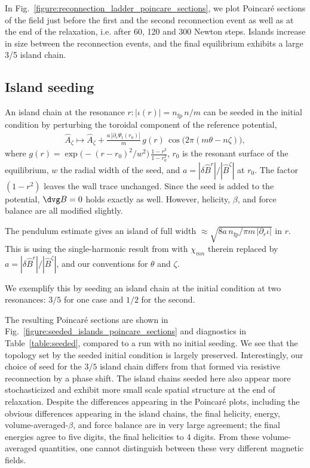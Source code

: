 \documentclass[%
 reprint,
 superscriptaddress,
 amsmath,amssymb,
 aps, nofootinbib, floatfix]{revtex4-2}
\begin{document}
In Fig.~\ref{figure:reconnection_ladder_poincare_sections}, we plot Poincar\'e sections of the field just before the first and the second reconnection event as well as at the end of the relaxation, i.e. after 60, 120 and 300 Newton steps. Islands increase in size between the reconnection events, and the final equilibrium exhibits a large 3/5 island chain.

\subsection{Island seeding}
\label{sec:island_seeding}

An island chain at the resonance $r: |\iota(r)| = n_{\mathrm{fp}}\, n / m$ can be seeded in the initial condition by perturbing the toroidal component of the reference potential,
\begin{align}
    \label{eq:island_seed}
    \hat A_\zeta \mapsto \hat A_\zeta + \frac{a \, |\partial_r \Psi_{\mathrm t}(r_0)|}{m}\, g(r)\, \cos\big( 2\pi (m\theta - n\zeta) \big),
\end{align}
where $g(r) = \exp\!\big(-(r - r_0)^2 / w^2\big)\, \frac{1 - r^2}{1 - r_0^2}$, $r_0$ is the resonant surface of the equilibrium, $w$ the radial width of the seed, and $a = |\delta \hat B^r| / |\hat B^\zeta|$ at $r_0$. The factor $(1 - r^2)$ leaves the wall trace unchanged. Since the seed is added to the potential, $\dvg B = 0$ holds exactly as well. However, helicity, $\beta$, and force balance are all modified slightly.   

The pendulum estimate gives an island of full width $\approx \sqrt{{8 a\, n_{\mathrm{fp}}}/{\pi m\,|\partial_r \iota|}}$ in $r$. This is using the single-harmonic result from \citep[Section~2.11]{helander_theory_2014} with $\chi_{mn}$ therein replaced by $a = |\delta \hat B^r| / |\hat B^\zeta|$, and our conventions for $\theta$ and $\zeta$. 

We exemplify this by seeding an island chain at the initial condition at two resonances: $3/5$ for one case and $1/2$ for the second.

The resulting Poincaré sections are shown in Fig.~\ref{figure:seeded_islands_poincare_sections} and diagnostics in Table~\ref{table:seeded}, compared to a run with no initial seeding. We see that the topology set by the seeded initial condition is largely preserved. Interestingly, our choice of seed for the $3/5$ island chain differs from that formed via resistive reconnection by a phase shift. The island chains seeded here also appear more stochasticized and exhibit more small scale spatial structure at the end of relaxation. Despite the differences appearing in the Poincaré plots, including the obvious differences appearing in the island chains, the final helicity, energy, volume-averaged-$\beta$, and force balance are in very large agreement; the final energies agree to five digits, the final helicities to 4 digits. From these volume-averaged quantities, one cannot distinguish between these very different magnetic fields. 
\end{document}
